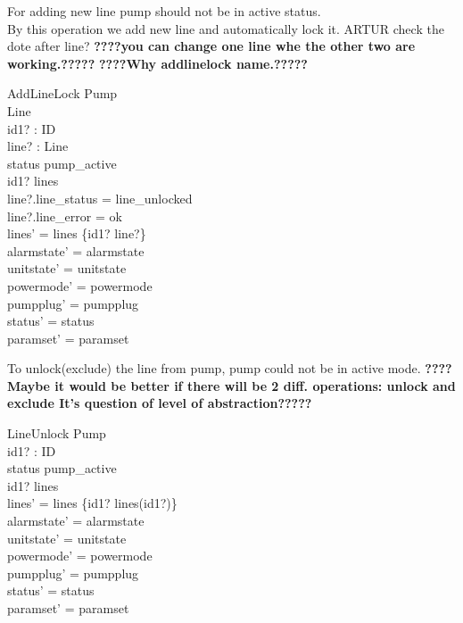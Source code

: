 \documentclass{article}
\begin{document}
		For adding new line pump should not be in active status.\\
		By this operation we add new line and automatically lock it. ARTUR check the dote after line?
\textbf{????you can change one line whe the other two are working.?????}
\textbf{????Why addlinelock name.?????}
    \begin{schema}{AddLineLock}
		\Delta Pump \\
		\Delta Line \\
		id1? : ID \\
		line? : Line \\
	\where
	    status \neq pump\_active \\
		id1? \notin \dom lines \\
		line?.line\_status = line\_unlocked \\
		line?.line\_error = ok\\
    	lines' = lines \cup \{id1? \mapsto line?\} \\
    	alarmstate' = alarmstate \\
    	unitstate' = unitstate \\
    	powermode' = powermode \\
    	pumpplug' = pumpplug \\
    	status' = status \\
    	paramset' = paramset

	\end{schema}

	
To unlock(exclude) the line from pump, pump could not be in active mode.
\textbf{????Maybe it would be better if there will be 2 diff. operations: unlock and exclude It's question of level of abstraction?????}
	\begin{schema}{LineUnlock}
		\Delta Pump \\
		id1? : ID \\
	\where
		 status \neq pump\_active \\
		id1? \in \dom lines \\
		lines' = lines \setminus \{id1? \mapsto lines(id1?)\} \\
    	alarmstate' = alarmstate \\
    	unitstate' = unitstate \\
    	powermode' = powermode \\
    	pumpplug' = pumpplug \\
    	status' = status \\
    	paramset' = paramset
	\end{schema}
	
\end{document}
